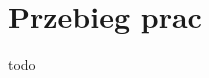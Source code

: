 \section{Przebieg prac}
\label{sec:przebieg-prac}
todo


\cite{artykul2011,ksiazka2011,narzedzie2011,projekt2011}
\newpage
